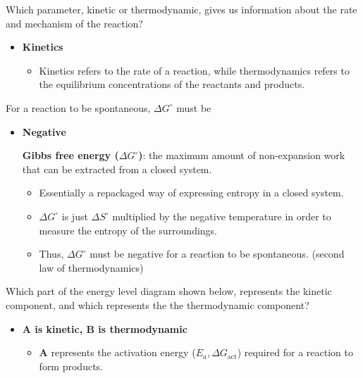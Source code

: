 \documentclass[12pt,a4paper]{article}
\begin{document}
\begin{enumerate}
    {\color{G-Moon}\item Which parameter, kinetic or thermodynamic, gives us information about the rate and mechanism of the reaction?}
        \begin{itemize}
            \item {\color{o-Sun}\textbf{Kinetics}} 
            \begin{itemize}
                \item Kinetics refers to the rate of a reaction, while thermodynamics refers to the equilibrium concentrations of the reactants and products.
            \end{itemize}
        \end{itemize}
    {\color{G-Moon}\item For a reaction to be spontaneous, \(\Delta G^\circ\) must be}
        \begin{itemize}
            \item {\color{o-Sun}\textbf{Negative}} 
            \begin{itemize}
                \textbf{Gibbs free energy (\(\Delta G^\circ\))}: the maximum amount of non-expansion work that can be extracted from a closed system.
                    \begin{itemize}
                        \item Essentially a repackaged way of expressing entropy in a closed system.
                        \item \(\Delta G^\circ\) is just \(\Delta S^\circ\) multiplied by the negative temperature in order to measure the entropy of the surroundings.
                        \item Thus, {\color{o-Sun}\(\Delta G^\circ\) must be {\color{neg}negative} for  a reaction to be spontaneous.} (second law of thermodynamics)
                    \end{itemize}
            \end{itemize}
        \end{itemize}
    {\color{G-Moon}\item Which part of the energy level diagram shown below, represents the kinetic component, and which represents the the thermodynamic component? }
        \begin{itemize}
            \item {\color{o-Sun}\textbf{A is kinetic, B is thermodynamic}} 
            \begin{itemize}
                \item \textbf{A} represents the activation energy (\(E_a, \Delta G_{\text{act}}\)) required for a reaction to form products.

\end{itemize}
\end{itemize}
\end{enumerate}
\end{document}

